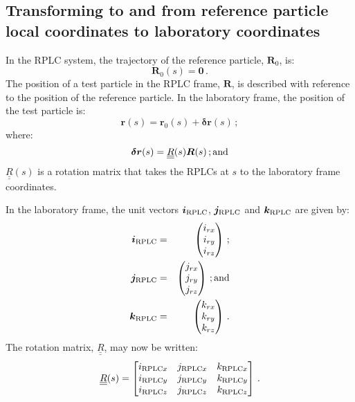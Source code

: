 \subsection{Transforming to and from reference particle local
            coordinates to laboratory coordinates}
            
In the RPLC system, the trajectory of the reference particle,
$\bm{R}_0$, is:
\begin{equation}
  \bm{R}_0(s) = \bm{0}\,.
\end{equation}
The position of a test particle in the RPLC frame, $\bm{R}$, is
described with reference to the position of the reference particle.
In the laboratory frame, the position of the test particle is:
\begin{equation}
  \bm{r}(s) = \bm{r}_0(s) + \bm{\delta r}(s) \,;
\end{equation}
where:
\begin{equation}
  \bm{\delta r}(s) = \underline{\underline{R}}(s) \bm{R}(s) \,{\rm ; and}
\end{equation}
$\underline{\underline{R}}(s)$ is a rotation matrix that takes
the RPLCs at $s$ to the laboratory frame coordinates.

In the laboratory frame, the unit vectors $\bm{i}_{\rm RPLC}$,
$\bm{j}_{\rm RPLC}$ and $\bm{k}_{\rm RPLC}$ are given by:
\begin{eqnarray}
  \bm{i}_{\rm RPLC} & = & \begin{pmatrix} i_{rx} \\ i_{ry} \\  i_{rz} \\ \end{pmatrix} \,;           \nonumber \\
  \bm{j}_{\rm RPLC} & = & \begin{pmatrix} j_{rx} \\ j_{ry} \\  j_{rz} \\ \end{pmatrix} \,{\rm ; and}           \\
  \bm{k}_{\rm RPLC} & = & \begin{pmatrix} k_{rx} \\ k_{ry} \\  k_{rz} \\ \end{pmatrix} \,.           \nonumber
\end{eqnarray}
The rotation matrix, $\underline{\underline{R}}$, may now be written:
\begin{equation}
  \underline{\underline{R}}(s) =
    \begin{bmatrix}
      i_{{\rm RPLC}x} & j_{{\rm RPLC}x} & k_{{\rm RPLC}x} \\
      i_{{\rm RPLC}y} & j_{{\rm RPLC}y} & k_{{\rm RPLC}y} \\
      i_{{\rm RPLC}z} & j_{{\rm RPLC}z} & k_{{\rm RPLC}z}
    \end{bmatrix} \,.
\end{equation}
